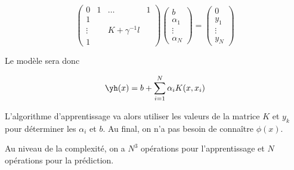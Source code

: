 $$\begin{pmatrix}
0 & 1 & \dots & 1 \\ 
1 &   &   &   \\ 
\vdots &   & K + \gamma^{-1}l &   \\ 
1 &   &   &  
\end{pmatrix} \begin{pmatrix}
b \\ 
\alpha_1 \\ 
\vdots \\ 
\alpha_N
\end{pmatrix} = \begin{pmatrix}
0 \\ 
y_1 \\ 
\vdots \\ 
y_N
\end{pmatrix} $$

Le modèle sera donc

$$\yh(x) = b + \sum_{i = 1}^N \alpha_i K(x, x_i)$$

L'algorithme d'apprentissage va alors utiliser les valeurs de la matrice $K$ et $y_k$ pour déterminer les $\alpha_i$ et $b$. Au final, on n'a pas besoin de connaître $\phi(x)$.

Au niveau de la complexité, on a $N^3$ opérations pour l'apprentissage et $N$ opérations pour la prédiction.

	


% 
		
		
